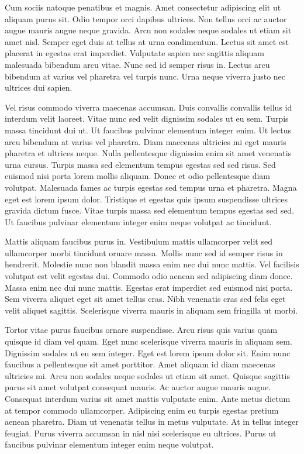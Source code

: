 \documentclass[11pt,a4paper]{article}
\begin{document}
Cum sociis natoque penatibus et magnis. Amet consectetur adipiscing elit ut aliquam purus sit. Odio tempor orci dapibus ultrices. Non tellus orci ac auctor augue mauris augue neque gravida. Arcu non sodales neque sodales ut etiam sit amet nisl. Semper eget duis at tellus at urna condimentum. Lectus sit amet est placerat in egestas erat imperdiet. Vulputate sapien nec sagittis aliquam malesuada bibendum arcu vitae. Nunc sed id semper risus in. Lectus arcu bibendum at varius vel pharetra vel turpis nunc. Urna neque viverra justo nec ultrices dui sapien.

Vel risus commodo viverra maecenas accumsan. Duis convallis convallis tellus id interdum velit laoreet. Vitae nunc sed velit dignissim sodales ut eu sem. Turpis massa tincidunt dui ut. Ut faucibus pulvinar elementum integer enim. Ut lectus arcu bibendum at varius vel pharetra. Diam maecenas ultricies mi eget mauris pharetra et ultrices neque. Nulla pellentesque dignissim enim sit amet venenatis urna cursus. Turpis massa sed elementum tempus egestas sed sed risus. Sed euismod nisi porta lorem mollis aliquam. Donec et odio pellentesque diam volutpat. Malesuada fames ac turpis egestas sed tempus urna et pharetra. Magna eget est lorem ipsum dolor. Tristique et egestas quis ipsum suspendisse ultrices gravida dictum fusce. Vitae turpis massa sed elementum tempus egestas sed sed. Ut faucibus pulvinar elementum integer enim neque volutpat ac tincidunt.

Mattis aliquam faucibus purus in. Vestibulum mattis ullamcorper velit sed ullamcorper morbi tincidunt ornare massa. Mollis nunc sed id semper risus in hendrerit. Molestie nunc non blandit massa enim nec dui nunc mattis. Vel facilisis volutpat est velit egestas dui. Commodo odio aenean sed adipiscing diam donec. Massa enim nec dui nunc mattis. Egestas erat imperdiet sed euismod nisi porta. Sem viverra aliquet eget sit amet tellus cras. Nibh venenatis cras sed felis eget velit aliquet sagittis. Scelerisque viverra mauris in aliquam sem fringilla ut morbi.

Tortor vitae purus faucibus ornare suspendisse. Arcu risus quis varius quam quisque id diam vel quam. Eget nunc scelerisque viverra mauris in aliquam sem. Dignissim sodales ut eu sem integer. Eget est lorem ipsum dolor sit. Enim nunc faucibus a pellentesque sit amet porttitor. Amet aliquam id diam maecenas ultricies mi. Arcu non sodales neque sodales ut etiam sit amet. Quisque sagittis purus sit amet volutpat consequat mauris. Ac auctor augue mauris augue. Consequat interdum varius sit amet mattis vulputate enim. Ante metus dictum at tempor commodo ullamcorper. Adipiscing enim eu turpis egestas pretium aenean pharetra. Diam ut venenatis tellus in metus vulputate. At in tellus integer feugiat. Purus viverra accumsan in nisl nisi scelerisque eu ultrices. Purus ut faucibus pulvinar elementum integer enim neque volutpat.
\end{document}
